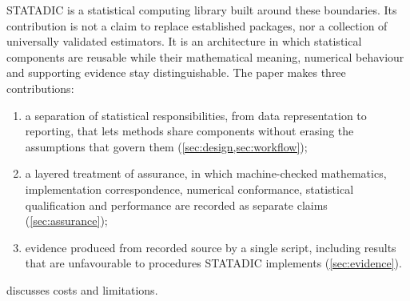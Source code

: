 STATADIC is a statistical computing library built around these boundaries. Its
contribution is not a claim to replace established packages, nor a collection
of universally validated estimators. It is an architecture in which statistical
components are reusable while their mathematical meaning, numerical behaviour
and supporting evidence stay distinguishable. The paper makes three
contributions:
\begin{enumerate}
  \item a separation of statistical responsibilities, from data representation
    to reporting, that lets methods share components without erasing the
    assumptions that govern them (\cref{sec:design,sec:workflow});
  \item a layered treatment of assurance, in which machine-checked
    mathematics, implementation correspondence, numerical conformance,
    statistical qualification and performance are recorded as separate claims
    (\cref{sec:assurance});
  \item evidence produced from recorded source by a single script, including
    results that are unfavourable to procedures STATADIC implements
    (\cref{sec:evidence}).
\end{enumerate}
 discusses costs and limitations.
